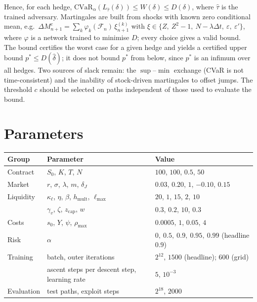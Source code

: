 \documentclass[11pt]{article}
\theoremstyle{definition}
\theoremstyle{remark}
\newcommand{\F}{\mathcal{F}}
\newcommand{\CVaR}{\mathrm{CVaR}}
\begin{document}
Hence, for each hedge, $\CVaR_\alpha(L_{\hat\tau}(\delta))\le W(\delta)\le D(\delta)$, where $\hat\tau$ is
the trained adversary. Martingales are built from shocks with known zero conditional mean, e.g.\
$\Delta M^c_{n+1}=\sum_k\varphi_k(\F_n)\,\xi^{(k)}_{n+1}$ with
$\xi\in\{Z,\ Z^2-1,\ N-\lambda\Delta t,\ \varepsilon,\ \varepsilon'\}$, where $\varphi$ is a network trained
to minimise $D$; every choice gives a valid bound. The bound certifies the worst case for a given hedge
and yields a certified upper bound $p^*\le D(\hat\delta)$; it does not bound $p^*$ from below, since $p^*$
is an infimum over all hedges. Two sources of slack remain: the $\sup$--$\min$ exchange (CVaR is not
time-consistent) and the inability of stock-driven martingales to offset jumps. The threshold $c$ should be
selected on paths independent of those used to evaluate the bound.

\section{Parameters}

\begin{center}
\begin{tabular}{@{}lll@{}}
\toprule
Group & Parameter & Value \\
\midrule
Contract & $S_0$, $K$, $T$, $N$ & $100$, $100$, $0.5$, $50$ \\
Market & $r$, $\sigma$, $\lambda$, $m$, $\delta_J$ & $0.03$, $0.20$, $1$, $-0.10$, $0.15$ \\
Liquidity & $\kappa_\ell$, $\eta$, $\beta$, $h_{\mathrm{mult}}$, $\ell_{\max}$ & $20$, $1$, $15$, $2$, $10$ \\
 & $\gamma_v$, $\zeta$, $z_{\mathrm{cap}}$, $w$ & $0.3$, $0.2$, $10$, $0.3$ \\
Costs & $s_0$, $Y$, $\psi$, $\rho_{\max}$ & $0.0005$, $1$, $0.05$, $4$ \\
Risk & $\alpha$ & $0,\ 0.5,\ 0.9,\ 0.95,\ 0.99$ (headline $0.9$) \\
Training & batch, outer iterations & $2^{12}$, $1500$ (headline); $600$ (grid) \\
 & ascent steps per descent step, learning rate & $5$, $10^{-3}$ \\
Evaluation & test paths, exploit steps & $2^{18}$, $2000$ \\
\bottomrule
\end{tabular}
\end{center}
\end{document}
